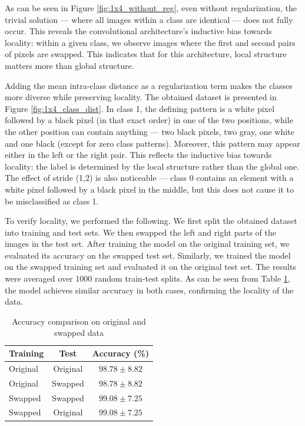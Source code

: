 \documentclass{article}
\begin{document}
As can be seen in Figure \ref{fig:1x4_without_reg}, even without regularization, the trivial solution — where all images within a class are identical — does not fully occur. This reveals the convolutional architecture's inductive bias towards locality: within a given class, we observe images where the first and second pairs of pixels are swapped. This indicates that for this architecture, local structure matters more than global structure.

Adding the mean intra-class distance as a regularization term makes the classes more diverse while preserving locality. The obtained dataset is presented in Figure \ref{fig:1x4_class_dist}. In class 1, the defining pattern is a white pixel followed by a black pixel (in that exact order) in one of the two positions, while the other position can contain anything — two black pixels, two gray, one white and one black (except for zero class patterns). Moreover, this pattern may appear either in the left or the right pair. This reflects the inductive bias towards locality: the label is determined by the local structure rather than the global one. The effect of stride (1,2) is also noticeable — class 0 contains an element with a white pixel followed by a black pixel in the middle, but this does not cause it to be misclassified as class 1.

To verify locality, we performed the following. We first split the obtained dataset into training and test sets. We then swapped the left and right parts of the images in the test set. After training the model on the original training set, we evaluated its accuracy on the swapped test set. Similarly, we trained the model on the swapped training set and evaluated it on the original test set. The results were averaged over 1000 random train-test splits. As can be seen from Table \ref{tab:swap_experiment}, the model achieves similar accuracy in both cases, confirming the locality of the data.

\begin{table}[h!]
\centering
\caption{Accuracy comparison on original and swapped data}
\label{tab:swap_experiment}
    \begin{tabular}{l c c}
    \hline
    \textbf{Training} & \textbf{Test} & \textbf{Accuracy (\%)} \\
    \hline
    Original & Original & $98.78 \pm 8.82$ \\
    Original & Swapped  & $98.78 \pm 8.82$ \\
    \hline
    Swapped  & Swapped  & $99.08 \pm 7.25$ \\
    Swapped  & Original & $99.08 \pm 7.25$ \\
    \hline
    \end{tabular}
\end{table}
\end{document}
